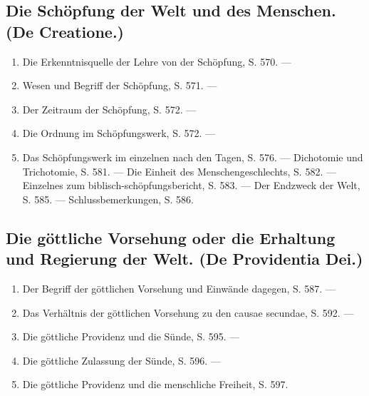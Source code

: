 \subsection*{Die Schöpfung der Welt und des Menschen. (De Creatione.)}
\begin{enumerate}
    \item Die Erkenntnisquelle der Lehre von der Schöpfung, S. 570. ---
    \item Wesen und Begriff der Schöpfung, S. 571. ---
    \item Der Zeitraum der Schöpfung, S. 572. ---
    \item Die Ordnung im Schöpfungswerk, S. 572. ---
    \item Das Schöpfungswerk im einzelnen nach den Tagen, S. 576. --- Dichotomie und Trichotomie, S. 581. --- Die Einheit des Menschengeschlechts, S. 582. --- Einzelnes zum biblisch-schöpfungsbericht, S. 583. --- Der Endzweck der Welt, S. 585. --- Schlussbemerkungen, S. 586.
\end{enumerate}

\subsection*{Die göttliche Vorsehung oder die Erhaltung und Regierung der Welt. (De Providentia Dei.)}
\begin{enumerate}
    \item Der Begriff der göttlichen Vorsehung und Einwände dagegen, S. 587. ---
    \item Das Verhältnis der göttlichen Vorsehung zu den causae secundae, S. 592. ---
    \item Die göttliche Providenz und die Sünde, S. 595. ---
    \item Die göttliche Zulassung der Sünde, S. 596. ---
    \item Die göttliche Providenz und die menschliche Freiheit, S. 597.
\end{enumerate}